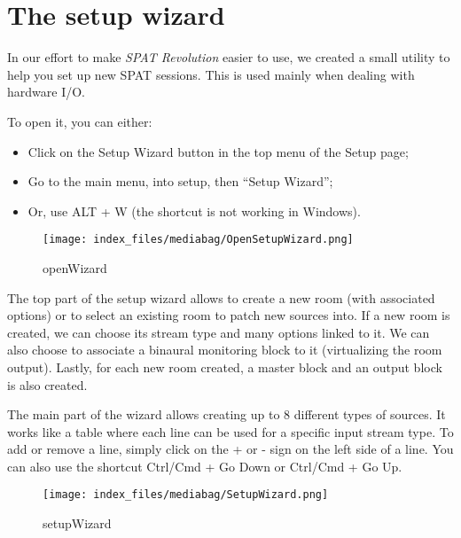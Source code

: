 \documentclass[
  letterpaper,
  DIV=11,
  numbers=noendperiod]{scrreport}
\providecommand{\tightlist}{%
  \setlength{\itemsep}{0pt}\setlength{\parskip}{0pt}}\usepackage{longtable,booktabs,array}
\begin{document}
\hypertarget{the-setup-wizard}{%
\section{The setup wizard}\label{the-setup-wizard}}

In our effort to make \emph{SPAT Revolution} easier to use, we created a
small utility to help you set up new SPAT sessions. This is used mainly
when dealing with hardware I/O.

To open it, you can either:

\begin{itemize}
\tightlist
\item
  Click on the Setup Wizard button in the top menu of the Setup page;
\item
  Go to the main menu, into setup, then ``Setup Wizard'';
\item
  Or, use ALT + W (the shortcut is not working in Windows).
\end{itemize}

\begin{figure}

{\centering \texttt{[image: index\_files/mediabag/OpenSetupWizard.png]}

}

\caption{openWizard}

\end{figure}

The top part of the setup wizard allows to create a new room (with
associated options) or to select an existing room to patch new sources
into. If a new room is created, we can choose its stream type and many
options linked to it. We can also choose to associate a binaural
monitoring block to it (virtualizing the room output). Lastly, for each
new room created, a master block and an output block is also created.

The main part of the wizard allows creating up to 8 different types of
sources. It works like a table where each line can be used for a
specific input stream type. To add or remove a line, simply click on the
+ or - sign on the left side of a line. You can also use the shortcut
Ctrl/Cmd + Go Down or Ctrl/Cmd + Go Up.

\begin{figure}

{\centering \texttt{[image: index\_files/mediabag/SetupWizard.png]}

}

\caption{setupWizard}

\end{figure}
\end{document}
